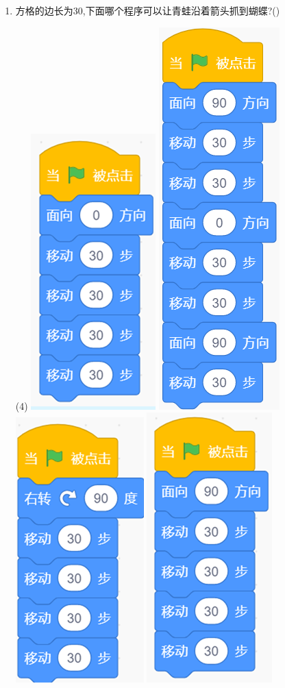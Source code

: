 \documentclass[10pt, a4paper]{article}
\begin{document}
\begin{enumerate}
        \item 方格的边长为30,下面哪个程序可以让青蛙沿着箭头抓到蝴蝶?(\qquad)
        \begin{tasks}(4)
            \task \includegraphics[width=.1\textwidth]{25a.png}
            \task \includegraphics[width=.08\textwidth]{25b.png}
            \task \includegraphics[width=.12\textwidth]{25c.png}
            \task \includegraphics[width=.12\textwidth]{25d.png}
        \end{tasks}
    \end{enumerate}
\end{document}
